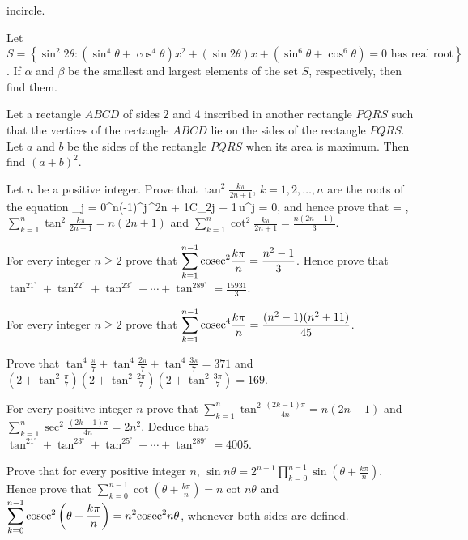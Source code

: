   incircle.
\item Let $S = \left\{\sin^{2}2\theta: \left(\sin^4\theta + \cos^4\theta\right)x^{2} + (\sin2\theta)x
  + \left(\sin^6\theta + \cos^6\theta\right) = 0 \text{ has real root}\right\}$. If $\alpha$ and $\beta$ be
  the smallest and largest elements of the set $S$, respectively, then find them.
\item Let a rectangle $ABCD$ of sides $2$ and $4$ inscribed in another rectangle $PQRS$ such that the
  vertices of the rectangle $ABCD$ lie on the sides of the rectangle $PQRS$. Let $a$ and $b$ be the sides of
  the rectangle $PQRS$ when its area is maximum. Then find $(a + b)^{2}$.
\item Let $n$ be a positive integer. Prove that $\tan^2\frac{k\pi}{2n + 1}$, $k = 1, 2, \ldots, n$ are the
  roots of the equation
  \startformula
    \sum_{j = 0}^{n}(-1)^j\,{}^{2n + 1}C_{2j + 1}\,u^j = 0,
  \stopformula
  and hence prove that
  \startformula
    \tan{}\tan{}\cdots\tan{} = ,
  \stopformula
  $\displaystyle\sum_{k = 1}^{n}\tan^2\frac{k\pi}{2n + 1} = n(2n + 1)$ and $\displaystyle\sum_{k =
    1}^{n}\cot^2\frac{k\pi}{2n + 1} = \frac{n(2n - 1)}{3}$.
\item For every integer $n\geq 2$ prove that $\displaystyle\sum_{k = 1}^{n - 1}{\rm cosec}^2\frac{k\pi}{n}
  = \frac{n^2 - 1}{3}$. Hence prove that $\tan^21^\circ + \tan^22^\circ + \tan^23^\circ + \cdots +
  \tan^289^\circ = \frac{15931}{3}$.
\item For every integer $n\geq 2$ prove that $\displaystyle\sum_{k = 1}^{n - 1}{\rm cosec}^4\frac{k\pi}{n}
  = \frac{(n^2 - 1)(n^2 + 11)}{45}$.
\item Prove that $\tan^4\frac{\pi}{7} + \tan^4\frac{2\pi}{7} + \tan^4\frac{3\pi}{7} = 371$ and
  $\left(2 + \tan^2\frac{\pi}{7}\right)\left(2 + \tan^2\frac{2\pi}{7}\right)\left(2 + \tan^2\frac{3\pi}{7}\right)
  = 169$.
\item For every positive integer $n$ prove that $\displaystyle\sum_{k = 1}^{n}\tan^2\frac{(2k - 1)\pi}{4n} =
  n(2n - 1)$ and $\displaystyle\sum_{k = 1}^{n}\sec^2\frac{(2k - 1)\pi}{4n} = 2n^2$. Deduce that
  $\tan^21^\circ + \tan^23^\circ + \tan^25^\circ + \cdots + \tan^289^\circ = 4005$.
\item Prove that for every positive integer $n$, $\sin n\theta = 2^{n - 1}\displaystyle\prod_{k = 0}^{n -
    1}\sin\left(\theta + \frac{k\pi}{n}\right)$. Hence prove that $\displaystyle\sum_{k = 0}^{n -
    1}\cot\left(\theta + \frac{k\pi}{n}\right) = n\cot n\theta$ and $\displaystyle\sum_{k = 0}^{n - 1}{\rm
    cosec}^2\left(\theta + \frac{k\pi}{n}\right) = n^2{\rm cosec}^2n\theta$, whenever both sides are defined.
